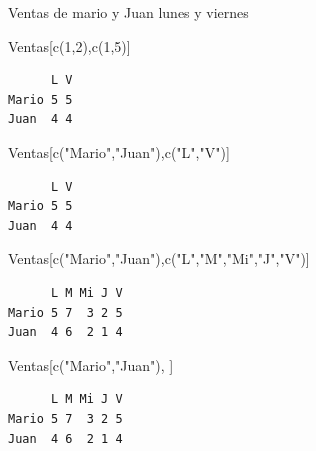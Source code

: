 \documentclass[
  ignorenonframetext,
  aspectratio=169,
  spanish,
]{beamer}
\newenvironment{Shaded}{\begin{snugshade}}{\end{snugshade}}
\newcommand{\DecValTok}[1]{\textcolor[rgb]{0.68,0.00,0.00}{#1}}
\newcommand{\FunctionTok}[1]{\textcolor[rgb]{0.28,0.35,0.67}{#1}}
\newcommand{\NormalTok}[1]{\textcolor[rgb]{0.00,0.23,0.31}{#1}}
\newcommand{\StringTok}[1]{\textcolor[rgb]{0.13,0.47,0.30}{#1}}
\begin{document}
\begin{frame}[fragile]{Ventas de mario y Juan lunes y viernes}
\label{ventas-de-mario-y-juan-lunes-y-viernes}
\begin{Shaded}
\begin{Highlighting}[]
\NormalTok{Ventas[}\FunctionTok{c}\NormalTok{(}\DecValTok{1}\NormalTok{,}\DecValTok{2}\NormalTok{),}\FunctionTok{c}\NormalTok{(}\DecValTok{1}\NormalTok{,}\DecValTok{5}\NormalTok{)] }
\end{Highlighting}
\end{Shaded}

\begin{verbatim}
      L V
Mario 5 5
Juan  4 4
\end{verbatim}

\begin{Shaded}
\begin{Highlighting}[]
\NormalTok{Ventas[}\FunctionTok{c}\NormalTok{(}\StringTok{"Mario"}\NormalTok{,}\StringTok{"Juan"}\NormalTok{),}\FunctionTok{c}\NormalTok{(}\StringTok{"L"}\NormalTok{,}\StringTok{"V"}\NormalTok{)] }
\end{Highlighting}
\end{Shaded}

\begin{verbatim}
      L V
Mario 5 5
Juan  4 4
\end{verbatim}

\begin{Shaded}
\begin{Highlighting}[]
\NormalTok{Ventas[}\FunctionTok{c}\NormalTok{(}\StringTok{"Mario"}\NormalTok{,}\StringTok{"Juan"}\NormalTok{),}\FunctionTok{c}\NormalTok{(}\StringTok{"L"}\NormalTok{,}\StringTok{"M"}\NormalTok{,}\StringTok{"Mi"}\NormalTok{,}\StringTok{"J"}\NormalTok{,}\StringTok{"V"}\NormalTok{)]}
\end{Highlighting}
\end{Shaded}

\begin{verbatim}
      L M Mi J V
Mario 5 7  3 2 5
Juan  4 6  2 1 4
\end{verbatim}

\begin{Shaded}
\begin{Highlighting}[]
\NormalTok{Ventas[}\FunctionTok{c}\NormalTok{(}\StringTok{"Mario"}\NormalTok{,}\StringTok{"Juan"}\NormalTok{), ] }
\end{Highlighting}
\end{Shaded}

\begin{verbatim}
      L M Mi J V
Mario 5 7  3 2 5
Juan  4 6  2 1 4
\end{verbatim}


\end{frame}
\end{document}
